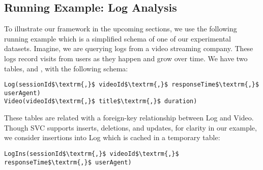 \subsection{Running Example: Log Analysis}
To illustrate our framework in the upcoming sections, we use the following running example which is a 
simplified schema of one of our experimental datasets.
Imagine, we are querying logs from a video streaming company. 
These logs record visits from users as they happen and grow over time.
We have two tables,  and , with the following schema:

\begin{lstlisting}[mathescape,basicstyle={\scriptsize}]
Log(sessionId$\textrm{,}$ videoId$\textrm{,}$ responseTime$\textrm{,}$ userAgent)
Video(videoId$\textrm{,}$ title$\textrm{,}$ duration)
\end{lstlisting}
These tables are related with a foreign-key relationship between
Log and Video.
Though SVC supports inserts, deletions, and updates, for clarity in our example, we consider insertions
into Log which is cached in a temporary table:

\begin{lstlisting}[mathescape,basicstyle={\scriptsize}]
LogIns(sessionId$\textrm{,}$ videoId$\textrm{,}$ responseTime$\textrm{,}$ userAgent)
\end{lstlisting}




